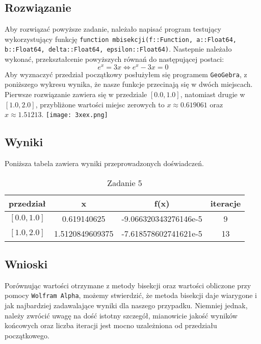 \documentclass{article}
\begin{document}
\begin{center}
    \subsection{Rozwiązanie}
     \large Aby rozwiązać powyższe zadanie, należało napisać program testujący wykorzystujący funkcję \newline
     \texttt{function mbisekcji(f::Function, a::Float64, b::Float64, delta::Float64, epsilon::Float64)}. \newline
     Nastepnie należało wykonać, przekształcenie powyższych równań do następującej postaci: \newline
     \[e^x = 3x \iff e^x - 3x = 0\] \newline
     Aby wyznaczyć przedział początkowy posłużyłem się programem \texttt{GeoGebra}, z poniższego wykresu wynika, że nasze funkcje przecinają się w dwóch miejscach.
     Pierwsze rozwiązanie zawiera się w przedziale \([0.0, 1.0]\), natomiast drugie w \([1.0, 2.0]\), przybliżone wartości miejsc zerowych to \(x \approx 0.619061\) oraz \(x \approx 1.51213\). \newline
     \newline
     \texttt{[image: 3xex.png]}
    \subsection{Wyniki}
    \large Poniższa tabela zawiera wyniki przeprowadzonych doświadczeń.
    \begin{table}[h!]
        \centering
        \begin{tabular}{||c c c c||} 
        \hline
        \textbf{przedział} & \textbf{x} & \textbf{f(x)} & \textbf{iteracje} \\ [0.5ex]
        \hline\hline
         \([0.0, 1.0]\) & 0.619140625 & -9.066320343276146e-5 & 9 \\
         \([1.0, 2.0]\) & 1.5120849609375 & -7.618578602741621e-5 & 13 \\
        \hline
        \end{tabular}
        \caption{Zadanie 5}
        \label{table:2}
    \end{table}

    \subsection{Wnioski}
    \large Porównując wartości otrzymane z metody bisekcji oraz wartości obliczone przy pomocy \texttt{Wolfram Alpha}, możemy 
     stwierdzić, że metoda bisekcji daje wiarygone i jak najbardziej zadawalające wyniki dla naszego przypadku. Niemniej jednak, należy
     zwrócić uwagę na dość istotny szczegół, mianowicie jakość wyników końcowych oraz liczba iteracji jest mocno uzależniona od przedziału początkowego.


\end{center}
\end{document}
